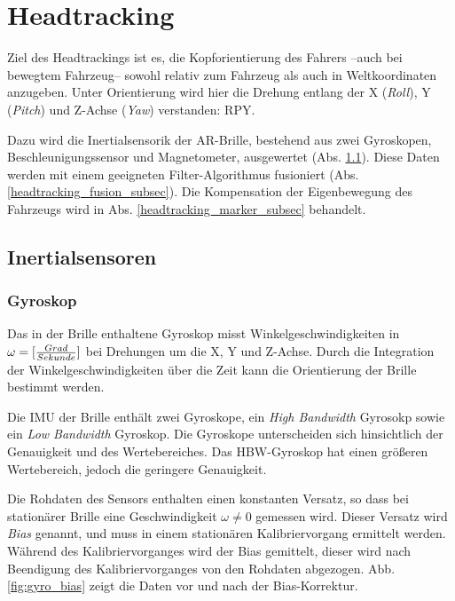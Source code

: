 
\section{Headtracking}

Ziel des Headtrackings ist es, die Kopforientierung des Fahrers --auch bei bewegtem Fahrzeug--
sowohl relativ zum Fahrzeug als auch in Weltkoordinaten anzugeben. Unter Orientierung wird hier die Drehung entlang der X (\emph{Roll}), Y (\emph{Pitch}) und Z-Achse (\emph{Yaw}) verstanden:
\acs{RPY}.

Dazu wird die Inertialsensorik der \ac{AR}-Brille, bestehend aus zwei Gyroskopen, Beschleunigungssensor und Magnetometer, ausgewertet (Abs. \ref{headtracking_imu_subsec}).
Diese Daten werden mit einem geeigneten Filter-Algorithmus fusioniert (Abs. \ref{headtracking_fusion_subsec}).
Die Kompensation der Eigenbewegung des Fahrzeugs wird in Abs. \ref{headtracking_marker_subsec} behandelt.


\subsection{Inertialsensoren}
\label{headtracking_imu_subsec}


\subsubsection{Gyroskop}
\label{headtracking_imu_gyro_subsubsec}

Das in der Brille enthaltene Gyroskop misst Winkelgeschwindigkeiten in
$\omega = [{Grad \over Sekunde}]$ bei Drehungen um die X, Y und Z-Achse. Durch
die Integration der Winkelgeschwindigkeiten über die Zeit kann die
Orientierung der Brille bestimmt werden.  

Die \ac{IMU} der Brille enthält zwei
Gyroskope, ein \emph{High Bandwidth} Gyrosokp sowie ein
\emph{Low Bandwidth} Gyroskop. Die Gyroskope unterscheiden sich
hinsichtlich der Genauigkeit und des Wertebereiches. Das \ac{HBW}-Gyroskop
hat einen größeren Wertebereich, jedoch die geringere
Genauigkeit.

Die Rohdaten des Sensors enthalten einen konstanten Versatz, so dass bei
stationärer Brille eine Geschwindigkeit $\omega \neq 0$ gemessen wird. Dieser
Versatz wird \emph{Bias} genannt, und muss in einem stationären
Kalibriervorgang ermittelt werden. Während des Kalibriervorganges wird
der Bias gemittelt, dieser wird nach Beendigung des Kalibriervorganges von den
Rohdaten abgezogen. Abb. \ref{fig:gyro_bias} zeigt die Daten vor und nach der
Bias-Korrektur.

